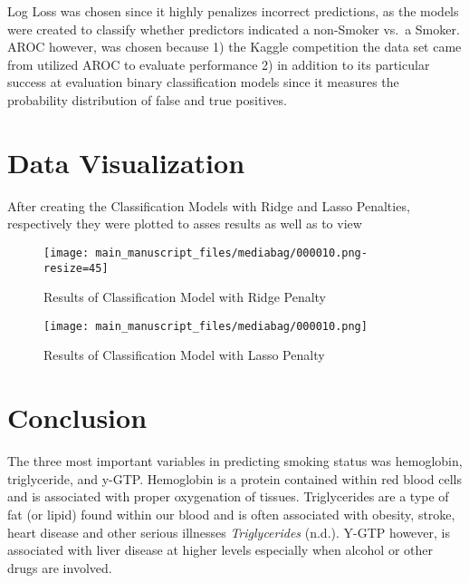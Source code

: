 \documentclass[
  12pt,
  letterpaper,
]{article}
\begin{document}
Log Loss was chosen since it highly penalizes incorrect predictions, as
the models were created to classify whether predictors indicated a
non-Smoker vs.~a Smoker. AROC however, was chosen because 1) the Kaggle
competition the data set came from utilized AROC to evaluate performance
2) in addition to its particular success at evaluation binary
classification models since it measures the probability distribution of
false and true positives.

\hypertarget{data-visualization}{%
\section{Data Visualization}\label{data-visualization}}

After creating the Classification Models with Ridge and Lasso Penalties,
respectively they were plotted to asses results as well as to view

\begin{figure}[!t]

{\centering \texttt{[image: main\_manuscript\_files/mediabag/000010.png-resize=45]}

}

\caption{Results of Classification Model with Ridge Penalty}

\end{figure}

\begin{figure}[!t]

{\centering \texttt{[image: main\_manuscript\_files/mediabag/000010.png]}

}

\caption{Results of Classification Model with Lasso Penalty}

\end{figure}

\hypertarget{conclusion}{%
\section{Conclusion}\label{conclusion}}

The three most important variables in predicting smoking status was
hemoglobin, triglyceride, and y-GTP. Hemoglobin is a protein contained
within red blood cells and is associated with proper oxygenation of
tissues. Triglycerides are a type of fat (or lipid) found within our
blood and is often associated with obesity, stroke, heart disease and
other serious illnesses \emph{Triglycerides} (n.d.). Y-GTP however, is
associated with liver disease at higher levels especially when alcohol
or other drugs are involved.
\end{document}
